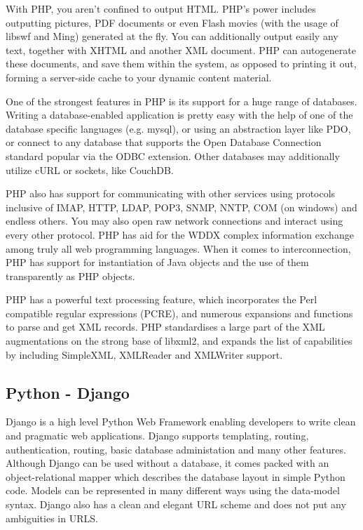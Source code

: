 \documentclass[../thesis.tex]{subfiles}
\begin{document}
With PHP, you aren't confined to output HTML. PHP's power includes outputting pictures, PDF documents or even Flash movies (with the usage of libswf and Ming) generated at the fly. You can additionally output easily any text, together with XHTML and another XML document. PHP can autogenerate these documents, and save them within the system, as opposed to printing it out, forming a server-side cache to your dynamic content material.
\newline
    
One of the strongest features in PHP is its support for a huge range of databases. Writing a database-enabled application is pretty easy with the help of one of the database specific languages (e.g. mysql), or using an abstraction layer like PDO, or connect to any database that supports the Open Database Connection standard popular via the ODBC extension. Other databases may additionally utilize cURL or sockets, like CouchDB.
\newline
    
PHP also has support for communicating with other services using protocols inclusive of IMAP, HTTP, LDAP, POP3, SNMP, NNTP, COM (on windows) and endless others. You may also open raw network connections and interact using every other protocol. PHP has aid for the WDDX complex information exchange among truly all web programming languages. When it comes to interconnection, PHP has support for instantiation of Java objects and the use of them transparently as PHP objects.
\newline
    
PHP has a powerful text processing feature, which incorporates the Perl compatible regular expressions (PCRE), and numerous expansions and functions to parse and get XML records. PHP standardises a large part of the XML augmentations on the strong base of libxml2, and expands the list of capabilities by including SimpleXML, XMLReader and XMLWriter support.

\subsection{Python - Django}
Django is a high level Python Web Framework enabling developers to write clean and pragmatic web applications. Django supports templating, routing, authentication, routing, basic database administation and many other features. Although Django can be used without a database, it comes packed with an object-relational mapper which describes the database layout in simple Python code. Models can be represented in many different ways using the data-model syntax. Django also has a clean and elegant URL scheme and does not put any ambiguities in URLS.
\end{document}
